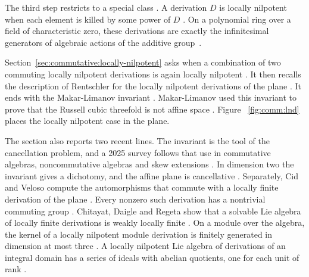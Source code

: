 The third step restricts to a special class
\cite[p.~354]{DaigleFreudenburg1998UFD}. A derivation $D$ is locally nilpotent
when each element is killed by some power of $D$
\cite[p.~354]{DaigleFreudenburg1998UFD}. On a polynomial ring over a field of
characteristic zero, these derivations are exactly the infinitesimal
generators of algebraic actions of the additive
group~\cite[p.~354]{DaigleFreudenburg1998UFD}.

Section~\ref{sec:commutative:locally-nilpotent} asks when a combination of two
commuting locally nilpotent derivations is again locally nilpotent
\cite[Theorem, p.~47]{FerreroLequainNowicki1992}. It then recalls the
description of Rentschler for the locally nilpotent derivations of the plane
\cite[pp.~356--357]{DaigleFreudenburg1998UFD}. It ends with the Makar-Limanov
invariant \cite[p.~65]{VanEssenKurodaKoenig2021}. Makar-Limanov used this
invariant to prove that the Russell cubic threefold is not affine space
\cite[p.~66]{VanEssenKurodaKoenig2021}. Figure ~\ref{fig:comm:lnd} places the
locally nilpotent case in the plane.


The section also reports two recent lines. The invariant is the tool of the
cancellation problem, and a 2025 survey follows that use in commutative
algebras, noncommutative algebras and skew extensions
\cite[pp.~1--3]{VenegasVenegas2025Cancellation}. In dimension two the
invariant gives a dichotomy, and the affine plane is cancellative
\cite[Theorems~2.2--2.3, p.~7]{VenegasVenegas2025Cancellation}. Separately,
Cid and Veloso compute the automorphisms that commute with a locally finite
derivation of the plane \cite[p.~1]{CidVeloso2026Isotropy}. Every nonzero such
derivation has a nontrivial commuting group \cite[Proposition~3.1,
p.~3]{CidVeloso2026Isotropy}. Chitayat, Daigle and Regeta show that a solvable
Lie algebra of locally finite derivations is weakly locally finite
\cite[Corollary~4, p.~2]{ChitayatDaigleRegeta2026}. On a module over the
algebra, the kernel of a locally nilpotent module derivation is finitely
generated in dimension at most three \cite[Corollary~4.7,
p.~10]{Tanaka2010ModuleDerivations}. A locally nilpotent Lie algebra of
derivations of an integral domain has a series of ideals with abelian
quotients, one for each unit of rank \cite[Theorem~1,
p.~5]{PetravchukShevchykSysak2017}.

